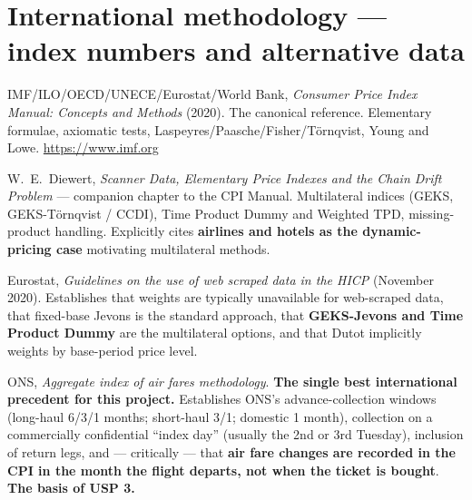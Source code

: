 \section{International methodology --- index numbers and alternative data}

\begin{enumerate}[label={[\arabic*]},start=18]
\item IMF/ILO/OECD/UNECE/Eurostat/World Bank, \emph{Consumer Price Index Manual: Concepts
and Methods} (2020). The canonical reference. Elementary formulae, axiomatic tests,
Laspeyres/Paasche/Fisher/T\"ornqvist, Young and Lowe. \url{https://www.imf.org}

\item W.\ E.\ Diewert, \emph{Scanner Data, Elementary Price Indexes and the Chain Drift
Problem} --- companion chapter to the CPI Manual. Multilateral indices (GEKS, GEKS-T\"ornqvist
/ CCDI), Time Product Dummy and Weighted TPD, missing-product handling. Explicitly cites
\textbf{airlines and hotels as the dynamic-pricing case} motivating multilateral methods.\\

\item Eurostat, \emph{Guidelines on the use of web scraped data in the HICP} (November
2020). Establishes that weights are typically unavailable for web-scraped data, that fixed-base
Jevons is the standard approach, that \textbf{GEKS-Jevons and Time Product Dummy} are the
multilateral options, and that Dutot implicitly weights by base-period price level.\\

\item ONS, \emph{Aggregate index of air fares methodology}. \textbf{The single best
international precedent for this project.} Establishes ONS's advance-collection windows
(long-haul 6/3/1 months; short-haul 3/1; domestic 1 month), collection on a commercially
confidential ``index day'' (usually the 2nd or 3rd Tuesday), inclusion of return legs, and
--- critically --- that \textbf{air fare changes are recorded in the CPI in the month the
flight departs, not when the ticket is bought}. \textbf{The basis of USP 3.}\\


\end{enumerate}
